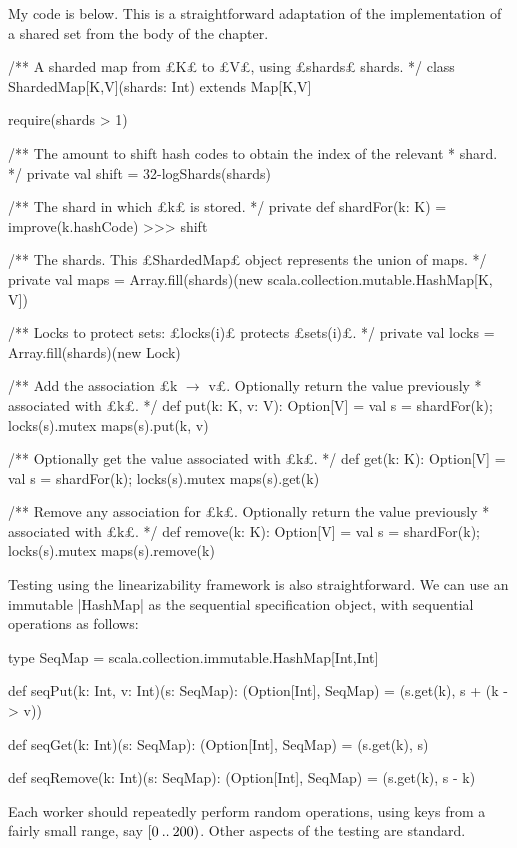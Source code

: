 \begin{answerS}
My code is below.  This is a straightforward adaptation of the
implementation of a shared set from the body of the chapter. 

 
\begin{scala}
/** A sharded map from £K£ to £V£, using £shards£ shards. */
class ShardedMap[K,V](shards: Int) extends Map[K,V]{
  require(shards > 1)

  /** The amount to shift hash codes to obtain the index of the relevant
    * shard. */
  private val shift = 32-logShards(shards)

  /** The shard in which £k£ is stored. */ 
  private def shardFor(k: K) = improve(k.hashCode) >>> shift

  /** The shards.  This £ShardedMap£ object represents the union of maps. */ 
  private val maps = 
    Array.fill(shards)(new scala.collection.mutable.HashMap[K, V])

  /** Locks to protect sets: £locks(i)£ protects £sets(i)£. */
  private val locks = Array.fill(shards)(new Lock)

  /** Add the association £k $\rightarrow$ v£.  Optionally return the value previously
    * associated with £k£. */
  def put(k: K, v: V): Option[V] = {
    val s = shardFor(k); locks(s).mutex{ maps(s).put(k, v) }
  }

  /** Optionally get the value associated with £k£. */
  def get(k: K): Option[V] = {
    val s = shardFor(k); locks(s).mutex{ maps(s).get(k) }
  }

  /** Remove any association for £k£.  Optionally return the value previously
    * associated with £k£. */
  def remove(k: K): Option[V] = {
    val s = shardFor(k); locks(s).mutex{ maps(s).remove(k) }
  }
}
\end{scala}

Testing using the linearizability framework is also straightforward.  We can
use an immutable |HashMap| as the sequential specification object, with
sequential operations as follows:
%
\begin{scala}
  type SeqMap = scala.collection.immutable.HashMap[Int,Int]

  def seqPut(k: Int, v: Int)(s: SeqMap): (Option[Int], SeqMap) = 
    (s.get(k), s + (k -> v))

  def seqGet(k: Int)(s: SeqMap): (Option[Int], SeqMap) = 
    (s.get(k), s)

  def seqRemove(k: Int)(s: SeqMap): (Option[Int], SeqMap) = 
    (s.get(k), s - k)
\end{scala}

Each worker should repeatedly perform random operations, using keys from a
fairly small range, say $[0 \mathbin{..} 200)$.  Other aspects of the testing are
standard. 
\end{answerS}
